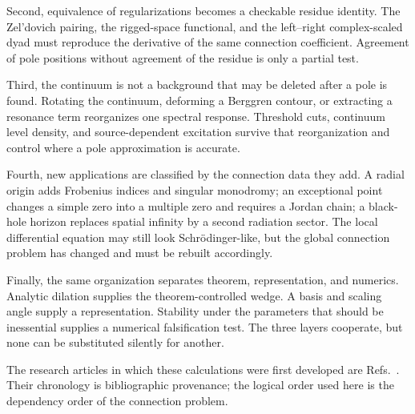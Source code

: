 Second, equivalence of regularizations becomes a checkable residue identity.
The Zel'dovich pairing, the rigged-space functional, and the left--right
complex-scaled dyad must reproduce the derivative of the same connection
coefficient.  Agreement of pole positions without agreement of the residue is
only a partial test.

Third, the continuum is not a background that may be deleted after a pole is
found.  Rotating the continuum, deforming a Berggren contour, or extracting a
resonance term reorganizes one spectral response.  Threshold cuts, continuum
level density, and source-dependent excitation survive that reorganization
and control where a pole approximation is accurate.

Fourth, new applications are classified by the connection data they add.  A
radial origin adds Frobenius indices and singular monodromy; an exceptional
point changes a simple zero into a multiple zero and requires a Jordan chain;
a black-hole horizon replaces spatial infinity by a second radiation sector.
The local differential equation may still look Schr\"odinger-like, but the
global connection problem has changed and must be rebuilt accordingly.

Finally, the same organization separates theorem, representation, and
numerics.  Analytic dilation supplies the theorem-controlled wedge.  A basis
and scaling angle supply a representation.  Stability under the parameters
that should be inessential supplies a numerical falsification test.  The
three layers cooperate, but none can be substituted silently for another.

The research articles in which these calculations were first developed are
Refs.~\cite{Morikawa:2025grx,Morikawa:2025xjq,Morikawa:2025vvs,
Morikawa:2025ezl,Morikawa:2025inx,Ogawa:2026veu,Ogawa:2026dSCSM}.
Their chronology is bibliographic provenance; the logical order used here is
the dependency order of the connection problem.
